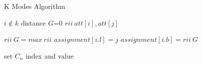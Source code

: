 \documentclass{article}
\begin{document}
\begin{algorithm}[H] 
\caption{K Modes Algorithm}

\begin{algorithmic}
\Statex

 \For{$i \in [0,N)$}
  \State $i \notin k$
  \State distance $G$=0
  \State $rii\ att[i],att[j]$
  
     \State $rii\ G = max \ rii$
     \State $assignment[i.l] = j$
     \State $assignment[i.b] = rii \ G$ 
    \EndIf

     \State set $ C_n$ index and value 
    \EndIf
\EndFor
\EndFor
\EndWhile
\State {}
\EndFunction
\end{algorithmic}
\end{algorithm}
\end{document}
